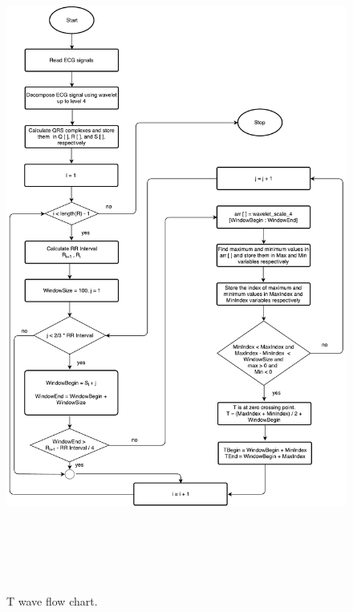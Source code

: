 \begin{figure}[htpb]
	\centering
	\includegraphics[width=25cm,height=22cm,keepaspectratio=true]{images/T_Wave.pdf}
	\caption{
		T wave flow chart.
	}
	\label{fig:t_peaks_flow_chart}
\end{figure}
